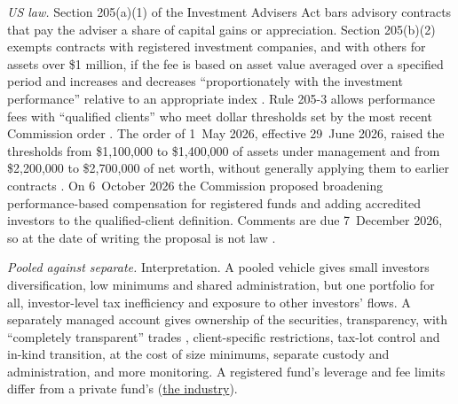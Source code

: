\begin{qfmethod}
\emph{US law.} Section 205(a)(1) of the Investment Advisers Act bars advisory contracts that pay the adviser a share of capital gains or appreciation. Section 205(b)(2) exempts contracts with registered investment companies, and with others for assets over \$1 million, if the fee is based on asset value averaged over a specified period and increases and decreases ``proportionately with the investment performance'' relative to an appropriate index \citep[subsecs.~(a)--(c)]{usc-15-80b-5}. Rule 205-3 allows performance fees with ``qualified clients'' who meet dollar thresholds set by the most recent Commission order \citep[paras.~(a) and~(d)(1)]{cfr-17-275-205-3}. The order of 1~May 2026, effective 29~June 2026, raised the thresholds from \$1{,}100{,}000 to \$1{,}400{,}000 of assets under management and from \$2{,}200{,}000 to \$2{,}700{,}000 of net worth, without generally applying them to earlier contracts \citep[secs.~II--III, p.~23521]{qualified-client-order-2026}. On 6~October 2026 the Commission proposed broadening performance-based compensation for registered funds and adding accredited investors to the qualified-client definition. Comments are due 7~December 2026, so at the date of writing the proposal is not law \citep[summary and dates, p.~63676]{performance-compensation-proposal-2026}.

 \emph{Pooled against separate.} Interpretation. A pooled vehicle gives small investors diversification, low minimums and shared administration, but one portfolio for all, investor-level tax inefficiency and exposure to other investors' flows. A separately managed account gives ownership of the securities, transparency, with ``completely transparent'' trades \citep[chap.~15, p.~502]{s7-ang}, client-specific restrictions, tax-lot control and in-kind transition, at the cost of size minimums, separate custody and administration, and more monitoring. A registered fund's leverage and fee limits differ from a private fund's (\hyperref[def:asset-management-industry]{the industry}).


\end{qfmethod}
